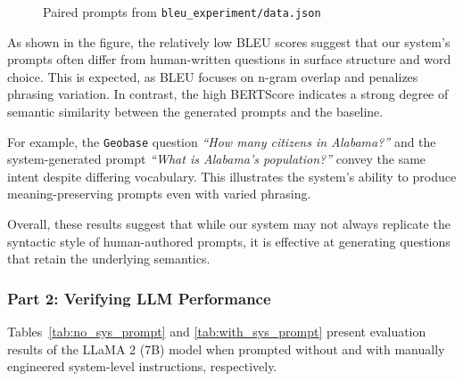 \documentclass{article}
\begin{document}
\begin{figure}[H]
    \centering
    
    \caption{Paired prompts from \texttt{bleu\_experiment/data.json}}
    \label{fig:paired_prompts}
\end{figure}

As shown in the figure, the relatively low BLEU scores suggest that our system’s prompts often differ 
from human-written questions in surface structure and word choice. This is expected, as BLEU focuses on n-gram 
overlap and penalizes phrasing variation. In contrast, the high BERTScore indicates a strong degree of semantic 
similarity between the generated prompts and the baseline.

For example, the \texttt{Geobase} question \emph{``How many citizens in Alabama?''} and the system-generated prompt 
\emph{``What is Alabama's population?''} convey the same intent despite differing vocabulary. This illustrates the 
system’s ability to produce meaning-preserving prompts even with varied phrasing.

Overall, these results suggest that while our system may not always replicate the syntactic style of human-authored 
prompts, it is effective at generating questions that retain the underlying semantics.

\subsubsection{Part 2: Verifying LLM Performance}

Tables~\ref{tab:no_sys_prompt} and \ref{tab:with_sys_prompt} present evaluation results of the LLaMA 2 (7B) 
model when prompted without and with manually engineered system-level instructions, respectively.

\begin{table}[H]
\centering
\caption{Llama Evaluation Results with \textbf{No} System Prompts}
\label{tab:no_sys_prompt}
\end{table}
\end{document}
